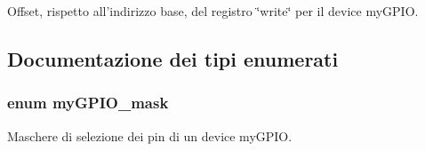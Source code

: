Offset, rispetto all'indirizzo base, del registro \char`\"{}write\char`\"{} per il device my\+G\+P\+I\+O. 



\subsection{Documentazione dei tipi enumerati}
\hypertarget{group__bare-metal_ga402a0d20afc0cb7c25554b8b023f4253}{
\subsubsection[{my\+G\+P\+I\+O\+\_\+mask}]{\setlength{\rightskip}{0pt plus 5cm}enum {\bf my\+G\+P\+I\+O\+\_\+mask}}}\label{group__bare-metal_ga402a0d20afc0cb7c25554b8b023f4253}


Maschere di selezione dei pin di un device my\+G\+P\+I\+O. 

